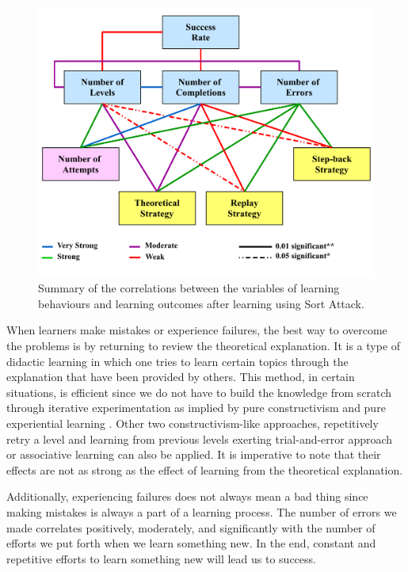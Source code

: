 \documentclass[conference]{IEEEtran}
\begin{document}
\begin{figure}
  \centering
  \includegraphics[width=\linewidth]{conclusion}
  \caption{Summary of the correlations between the variables of learning behaviours and learning outcomes after learning using Sort Attack.}
  \label{fig:conclusion}
\end{figure}

When learners make mistakes or experience failures, the best way to overcome the problems is by returning to review the theoretical explanation. It is a type of didactic learning \cite{Austin2013} in which one tries to learn certain topics through the explanation that have been provided by others. This method, in certain situations, is efficient since we do not have to build the knowledge from scratch through iterative experimentation as implied by pure constructivism \cite{McComas2014} and pure experiential learning \cite{kolb2014experiential}. Other two constructivism-like approaches, repetitively retry a level and learning from previous levels exerting trial-and-error approach \cite{Fitzgerald2009} or associative learning \cite{Jozefowiez2012} can also be applied. It is imperative to note that their effects are not as strong as the effect of learning from the theoretical explanation.

Additionally, experiencing failures does not always mean a bad thing since making mistakes is always a part of a learning process. The number of errors we made correlates positively, moderately, and significantly with the number of efforts we put forth when we learn something new. In the end, constant and repetitive efforts to learn something new will lead us to success.
\end{document}
